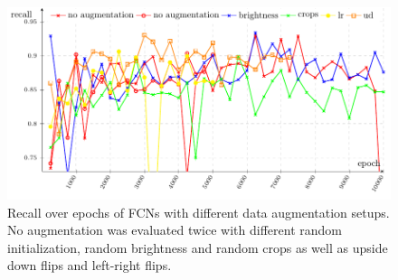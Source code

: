 \begin{appendices}
\begin{figure}[ht]
    \centering
    \includegraphics[width=\linewidth]{csv-line-plot/recall-all.pdf}
    \caption{Recall over epochs of FCNs with different data augmentation
             setups. No augmentation was evaluated twice with different
             random initialization, random brightness and random crops as
             well as upside down flips and left-right flips.}
    \label{fig:graph-recall-all}
\end{figure}


\end{appendices}
